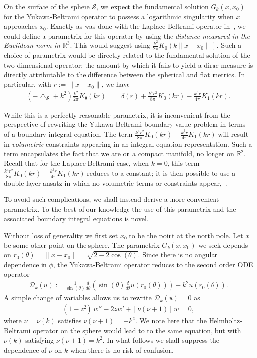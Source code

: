 \documentclass[final]{siamltex}
\newcommand{\lap}{\bigtriangleup}
\renewcommand{\S} {\mathcal{S}}
\begin{document}
On the surface of the sphere $\S$, we expect the fundamental solution
$G_k(x,x_{0})$ for the Yukawa-Beltrami operator to possess a
logarithmic singularity when $x$ approaches $x_{0}$. Exactly as was
done  with the Laplace-Beltrami operator in~\cite{gemmrich}, we could
define a parametrix for this operator by using the {\it distance
measured in the Euclidean norm in $\mathbb{R}^3$}. This would suggest
using $ \frac{k^2}{2\pi}K_0(k\|x-x_{0}\|)$.  Such a choice of
parametrix would be directly related to the fundamental solution of the
two-dimensional operator; the amount by which it fails to yield a dirac
measure is directly attributable to the difference between the
spherical and flat metrics.  In particular, with $r:=\|x-x_{0}\|$, we
have
\begin{align*}
  (-\lap_{\S} + k^{2})\frac{k^2}{2\pi}K_0(kr)&=
    \delta(r) 
    +\frac{k^{4}r^{2}}{8\pi}K_{0}(kr) - \frac{k^{3}r}{4\pi}K_{1}(kr).
\end{align*}

While this is a perfectly reasonable parametrix, it is inconvenient from
the perspective of rewriting the Yukawa-Beltrami boundary value problem
in terms of a boundary integral equation. The term $\frac{k^{4}r^{2}}{8\pi}K_{0}(kr) - \frac{k^{3}r}{4\pi}K_{1}(kr)$ will result
in {\it volumetric} constraints  appearing in an integral equation
representation. Such a term encapsulates the fact that we are on a
compact manifold, no longer on $\mathbb{R}^2$. Recall that for the
Laplace-Beltrami case, when $k=0$, this term $\frac{k^{4}r^{2}}{8\pi}K_{0}(kr) - \frac{k^{3}r}{4\pi}K_{1}(kr)$ reduces to a
constant; it is then possible to use a double layer ansatz in which no
volumetric terms or constraints appear,~\cite{kro:nig2013}.  

To avoid
such complications, we shall instead derive a more convenient
parametrix. To the best of our knowledge the use of this parametrix and
the associated boundary integral equations is novel. 

Without loss of generality we first set $x_{0}$ to be the point at the
north pole.  Let $x$ be some other point on the sphere. The parametrix
$G_k(x,x_0)$ we seek depends on
$r_0(\theta)=\|x-x_0\|=\sqrt{2-2\cos(\theta)}$. Since there is no
angular dependence in $\phi$, the Yukawa-Beltrami operator reduces to
the second order ODE operator
\begin{align*}
\mathcal{D}_k(u):=\frac{1}{\sin(\theta)}\frac{d}{d\theta}\left(\sin(\theta)
\frac{d}{d\theta}u(r_0(\theta))\right)-k^2 u(r_{0}(\theta)).
\end{align*}
A simple change of variables allows us to rewrite $\mathcal{D}_k (u)=0$
as 
\begin{align}
  \label{LegendrePequation}
  (1-z^2)\,w'' -2zw' + \left[\nu(\nu+1)\right]\,w = 0,
\end{align}
where $\nu = \nu(k)$ satisfies $\nu(\nu + 1) = -k^2$. We note here that
the Helmholtz-Beltrami operator on the sphere would lead to to the same
equation, but with $\nu(k)$ satisfying $\nu(\nu+1)=k^{2}$. In what
follows we shall suppress the dependence of $\nu$ on $k$ when there is
no risk of confusion.
\end{document}
